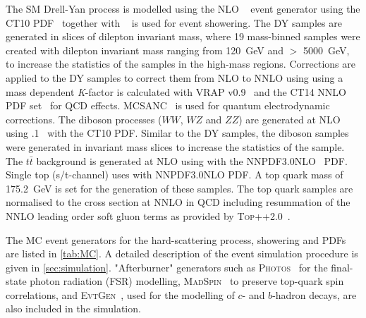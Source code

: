 The SM Drell-Yan process is modelled using the NLO \POWHEGBOX~\cite{Alioli:2010xd,Frixione:2007vw} event generator using the CT10 PDF~\cite{ct10} together with ~\cite{pythia8} is used for event showering. The DY samples are generated in slices of dilepton invariant mass, where 19 mass-binned samples were created with dilepton invariant mass ranging from \SI{120}{\giga\electronvolt} and $>$ \SI{5000}{\giga\electronvolt}, to increase the statistics of the samples in the high-mass regions. Corrections are applied to the DY samples to correct them from NLO to NNLO using using a mass dependent \emph{K}-factor is calculated with {\textsc{VRAP}} v0.9~\cite{vrap} and the CT14 NNLO PDF set~\cite{CT14} for QCD effects. {\textsc{MCSANC}}~\cite{MCSANC} is used for quantum electrodynamic corrections.  The diboson processes ($WW$, $WZ$ and $ZZ$) are generated at NLO using .1~\cite{Gleisberg:2008ta} with the CT10 PDF. Similar to the DY samples, the diboson samples were generated in invariant mass slices to increase the statistics of the sample. The $t\bar{t}$ background is generated at NLO using \POWHEGBOX with the NNPDF3.0NLO~\cite{Ball:2014uwa} PDF. Single top (s/t-channel) uses \POWHEGBOX with NNPDF3.0NLO PDF. A top quark mass of \SI{175.2}{\giga\electronvolt} is set for the generation of these samples. The top quark samples are normalised to the cross section at NNLO in QCD including resummation of the NNLO leading order soft gluon terms as provided by \textsc{Top++}2.0~\cite{Czakon:2011xx}.

The MC event generators for the hard-scattering process, showering and PDFs are listed in \cref{tab:MC}. A detailed description of the event simulation procedure is given in \cref{sec:simulation}. "Afterburner" generators such as \textsc{Photos}~\cite{Golonka:2005pn} for the final-state photon radiation (FSR) modelling, \textsc{MadSpin}~\cite{Artoisenet:2012st} to preserve top-quark spin correlations, and \textsc{EvtGen}~\cite{Lange:2001uf}, used for the modelling of $c$- and $b$-hadron decays, are also included in the simulation.

